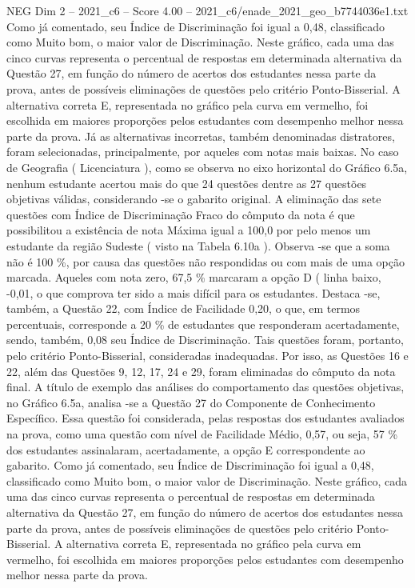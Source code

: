 \begin{textsample}{NEG Dim 2 – 2021\_c6 – Score 4.00 – 2021\_c6/enade\_2021\_geo\_b7744036e1.txt}
Como já comentado, seu Índice de Discriminação foi igual a 0,48, classificado como Muito bom, o maior valor de Discriminação.
Neste gráfico, cada uma das cinco curvas representa o percentual de respostas em determinada alternativa da Questão 27, em função do número de acertos dos estudantes nessa parte da prova, antes de possíveis eliminações de questões pelo critério Ponto-Bisserial.
A alternativa correta E, representada no gráfico pela curva em vermelho, foi escolhida em maiores proporções pelos estudantes com desempenho melhor nessa parte da prova.
Já as alternativas incorretas, também denominadas distratores, foram selecionadas, principalmente, por aqueles com notas mais baixas.
No caso de Geografia ( Licenciatura ), como se observa no eixo horizontal do Gráfico 6.5a, nenhum estudante acertou mais do que 24 questões dentre as 27 questões objetivas válidas, considerando -se o gabarito original.
A eliminação das sete questões com Índice de Discriminação Fraco do cômputo da nota é que possibilitou a existência de nota Máxima igual a 100,0 por pelo menos um estudante da região Sudeste ( visto na Tabela 6.10a ).
Observa -se que a soma não é 100 \%, por causa das questões não respondidas ou com mais de uma opção marcada.
Aqueles com nota zero, 67,5 \% marcaram a opção D ( linha baixo, -0,01, o que comprova ter sido a mais difícil para os estudantes.
Destaca -se, também, a Questão 22, com Índice de Facilidade 0,20, o que, em termos percentuais, corresponde a 20 \% de estudantes que responderam acertadamente, sendo, também, 0,08 seu Índice de Discriminação.
Tais questões foram, portanto, pelo critério Ponto-Bisserial, consideradas inadequadas.
Por isso, as Questões 16 e 22, além das Questões 9, 12, 17, 24 e 29, foram eliminadas do cômputo da nota final.
A título de exemplo das análises do comportamento das questões objetivas, no Gráfico 6.5a, analisa -se a Questão 27 do Componente de Conhecimento Específico.
Essa questão foi considerada, pelas respostas dos estudantes avaliados na prova, como uma questão com nível de Facilidade Médio, 0,57, ou seja, 57 \% dos estudantes assinalaram, acertadamente, a opção E correspondente ao gabarito.
Como já comentado, seu Índice de Discriminação foi igual a 0,48, classificado como Muito bom, o maior valor de Discriminação.
Neste gráfico, cada uma das cinco curvas representa o percentual de respostas em determinada alternativa da Questão 27, em função do número de acertos dos estudantes nessa parte da prova, antes de possíveis eliminações de questões pelo critério Ponto-Bisserial.
A alternativa correta E, representada no gráfico pela curva em vermelho, foi escolhida em maiores proporções pelos estudantes com desempenho melhor nessa parte da prova.

\end{textsample}
